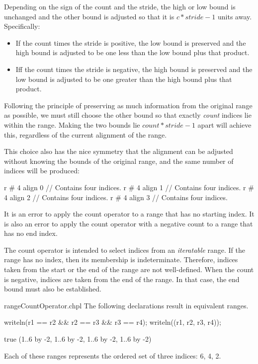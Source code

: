 Depending on the sign of the count and the stride, the high or low bound is
unchanged and the other bound is adjusted so that it is $c * stride - 1$ units
away.  Specifically:
\begin{itemize}
\item If the count times the stride is positive, the low bound is preserved
and the high bound is adjusted to be one less than the low bound plus that
product.
\item Iff the count times the stride is negative, the high bound is preserved
and the low bound is adjusted to be one greater than the high bound plus that
product.
\end{itemize}

\begin{rationale}
Following the principle of preserving as much information from the original
range as possible, we must still choose the other bound so that
exactly \emph{count} indices lie within the range.  Making the two bounds lie
$count * stride - 1$ apart will achieve this, regardless of the current
alignment of the range.

This choice also has the nice symmetry that the alignment can be adjusted
without knowing the bounds of the original range, and the same number of indices
will be produced:
\begin{chapel}
r # 4 align 0   // Contains four indices.
r # 4 align 1   // Contains four indices.
r # 4 align 2   // Contains four indices.
r # 4 align 3   // Contains four indices.
\end{chapel}
\end{rationale}

It is an error to apply the count operator to a range that
has no starting index.  It is also an error to apply the count operator
with a negative count to a range that has no end index.

\begin{rationale}
The count operator is intended to select indices from an \emph{iteratable}
range.  If the range has no  index, then its membership is
indeterminate.  Therefore, indices taken from the start or the end of the range
are not well-defined.  When the count is negative, indices are taken from the
end of the range.  In that case, the end bound must also be established.
\end{rationale}

\begin{chapelexample}{rangeCountOperator.chpl}
The following declarations result in equivalent ranges.
\begin{chapelpost}
writeln(r1 == r2 \&\& r2 == r3 \&\& r3 == r4);
writeln((r1, r2, r3, r4));
\end{chapelpost}
\begin{chapeloutput}
true
(1..6 by -2, 1..6 by -2, 1..6 by -2, 1..6 by -2)
\end{chapeloutput}
Each of these ranges represents the ordered set of three indices: 6, 4, 2.
\end{chapelexample}

